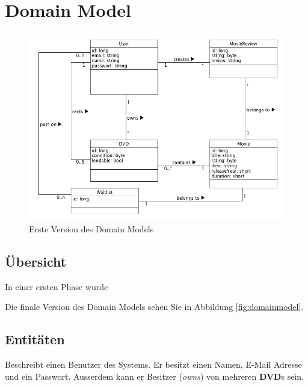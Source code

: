 \chapter{Domain Model}
\label{chap:domainmodel}

\begin{figure}[h]
	\centering
	\includegraphics[width=1\textwidth]{img/domain_model.png}
	\caption{Erste Version des Domain Models}
\end{figure}

\section{Übersicht}
In einer ersten Phase wurde 

Die finale Version des Domain Models sehen Sie in Abbildung \ref{fig:domainmodel}.

\section{Entitäten}

Beschreibt einen Benutzer des Systems. Er besitzt einen Namen, E-Mail Adresse und ein Passwort. Ausserdem kann er Besitzer (\emph{owns}) von mehreren \textbf{DVD}s sein.






